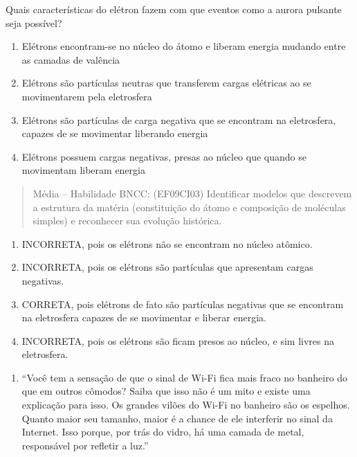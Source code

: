 Quais características do elétron fazem com que eventos como a aurora
pulsante seja possível?

\begin{enumerate}
\def\labelenumi{(\Alph{enumi})}
\item
  Elétrons encontram-se no núcleo do átomo e liberam energia mudando
  entre as camadas de valência
\item
  Elétrons são partículas neutras que transferem cargas elétricas ao se
  movimentarem pela eletrosfera
\item
  Elétrons são partículas de carga negativa que se encontram na
  eletrosfera, capazes de se movimentar liberando energia
\item
  Elétrons possuem cargas negativas, presas ao núcleo que quando se
  movimentam liberam energia
\end{enumerate}

\begin{quote}
Média -- Habilidade BNCC: (EF09CI03) Identificar modelos que descrevem a
estrutura da matéria (constituição do átomo e composição de moléculas
simples) e reconhecer sua evolução histórica.
\end{quote}

\begin{enumerate}
\def\labelenumi{(\Alph{enumi})}
\item
  INCORRETA, pois os elétrons não se encontram no núcleo atômico.
\item
  INCORRETA, pois os elétrons são partículas que apresentam cargas
  negativas.
\item
  CORRETA, pois elétrons de fato são partículas negativas que se
  encontram na eletrosfera capazes de se movimentar e liberar energia.
\item
  INCORRETA, pois os elétrons são ficam presos ao núcleo, e sim livres
  na eletrosfera.
\end{enumerate}

\begin{enumerate}
\def\labelenumi{\arabic{enumi})}
\item
  ``Você tem a sensação de que o sinal de Wi-Fi fica mais fraco no
  banheiro do que em outros cômodos? Saiba que isso não é um mito e
  existe uma explicação para isso. Os grandes vilões do Wi-Fi no
  banheiro são os espelhos. Quanto maior seu tamanho, maior é a chance
  de ele interferir no sinal da Internet. Isso porque, por trás do
  vidro, há uma camada de metal, responsável por refletir a luz.''
\end{enumerate}


